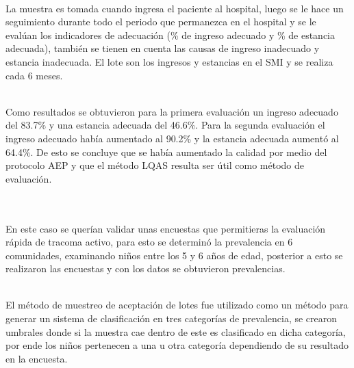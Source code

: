 ~\\La muestra es tomada cuando ingresa el paciente al hospital, luego se le hace un seguimiento durante todo el periodo que permanezca en el hospital y se le eval\'{u}an los indicadores de adecuaci\'{o}n (\% de ingreso adecuado y \% de estancia adecuada), tambi\'{e}n se tienen en cuenta las causas de ingreso inadecuado y estancia inadecuada. El lote son los ingresos y estancias en el SMI y se realiza cada 6 meses.

~\\Como resultados se obtuvieron para la primera evaluaci\'{o}n un ingreso adecuado del 83.7\% y una estancia adecuada del 46.6\%. Para la segunda evaluaci\'{o}n  el ingreso adecuado hab\'{i}a aumentado al 90.2\% y la estancia adecuada aument\'{o} al 64.4\%. De esto se concluye que se hab\'{i}a aumentado la calidad por medio del protocolo AEP y que el m\'{e}todo LQAS resulta ser \'{u}til como m\'{e}todo de evaluaci\'{o}n.


~\\\textbf{\citet{AE4}}
~\\En este caso se quer\'{i}an validar unas encuestas que permitieras la evaluaci\'{o}n r\'{a}pida de tracoma activo, para esto se determin\'{o} la prevalencia en 6 comunidades, examinando ni\~{n}os entre los 5 y 6 a\~{n}os de edad, posterior a esto se realizaron las encuestas y con los datos se obtuvieron prevalencias.

~\\El m\'{e}todo de muestreo de aceptaci\'{o}n de lotes fue utilizado como un m\'{e}todo para generar un sistema de clasificaci\'{o}n en tres categor\'{i}as de prevalencia, se crearon umbrales donde si la muestra cae dentro de este es clasificado en dicha categor\'{i}a, por ende los ni\~{n}os pertenecen a una u otra categor\'{i}a dependiendo de su resultado en la encuesta.
